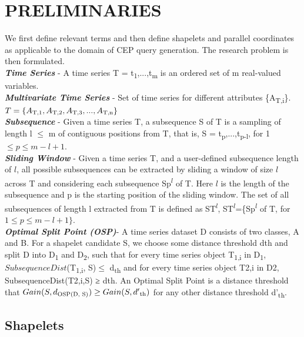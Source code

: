 \documentclass[conference]{IEEEtran}  %
\begin{document}
\section{PRELIMINARIES}
We first define relevant terms and then define shapelets and parallel coordinates as applicable to the domain of CEP query generation. The research problem is then formulated.
\medskip\\
\textbf{\textit{Time Series}} - A time series T = t\textsubscript{1},...,t\textsubscript{m} is an ordered set of m real-valued variables.
\smallskip\\
\textbf{\textit{Multivariate Time Series}} - Set of time series for different attributes \{A\textsubscript{T,i}\}. \(T = \{A\textsubscript{T,1},A\textsubscript{T,2},A\textsubscript{T,3},...,A\textsubscript{T,n}\}\)
\smallskip\\
\textbf{\textit{Subsequence}} - Given a time series T, a subsequence S of T is a sampling of length l \(\leq\) m of contiguous positions from T, that is, S = t\textsubscript{p},...,t\textsubscript{p-l}, for 1 \(\leq p \leq m - l + 1\).
\smallskip\\
\textbf{\textit{Sliding Window}} - Given a time series T, and a user-defined subsequence length of \(l\), all possible subsequences can be extracted by sliding a window of size  \(l\) across T and considering each subsequence Sp\textsuperscript{\(l\)} of T. Here \(l\) is the length of the subsequence and p is the starting position of the sliding window. The set of all subsequences of length l extracted from T is defined as ST\textsuperscript{\(l\)}, ST\textsuperscript{\(l\)}=\{Sp\textsuperscript{\(l\)} of T, for \(1 \leq p \leq m - l + 1\}\).
\smallskip\\
\textbf{\textit{Optimal Split Point (OSP)}}- A time series dataset D consists of two classes, A and B. For a shapelet candidate S, we choose some distance threshold dth and split D into D\textsubscript{1} and D\textsubscript{2}, such that for every time series object T\textsubscript{1,i} in D\textsubscript{1}, \(SubsequenceDist\)(T\textsubscript{1,i}, S)\(\leq\) d\textsubscript{th} and for every time series object T2,i in D2, SubsequenceDist(T2,i,S) ≥ dth. An Optimal Split Point is a distance threshold that \(Gain(S, d\textsubscript{OSP(D, S)}) \geq Gain(S, d'\textsubscript{th})\) for any other distance threshold d'\textsubscript{th}.

\subsection{Shapelets}
\end{document}
